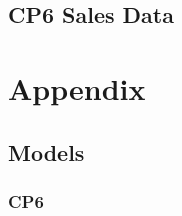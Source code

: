 \documentclass{article}
\begin{document}
\subsection{CP6 Sales Data}
\label{sec:cp6-sales-data}


\section{Appendix}
\label{sec:appendix}


\subsection{Models}
\label{sec:models}

\subsubsection{CP6}
\label{sec:cp6}





\printbibliography{}
\end{document}
